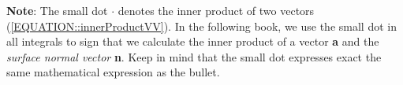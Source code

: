 	\textbf{Note}: The small dot $\cdot$  denotes the inner product of two
    vectors (\ref{EQUATION::innerProductVV}). In the following book, we use
    the small dot in all integrals to sign that we calculate the inner product
    of a vector \textbf{a} and the \textit{surface normal vector} \textbf{n}.
    Keep in mind that the small dot expresses exact the same mathematical
    expression as the bullet.


